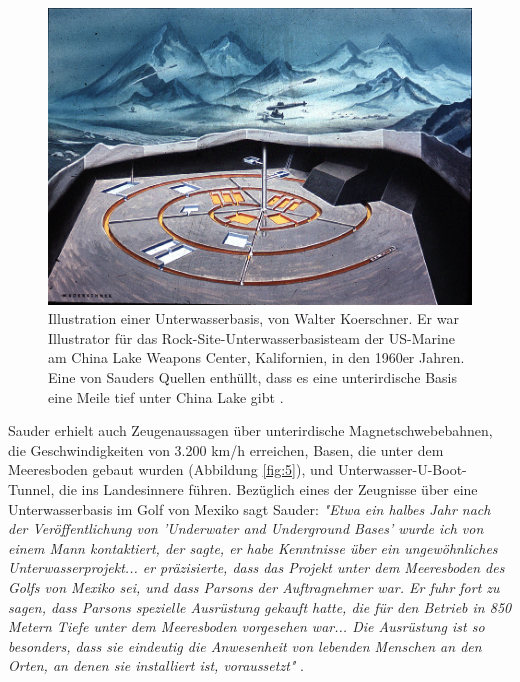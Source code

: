 \documentclass[10pt,twocolumn,letterpaper]{article}
\begin{document}
\begin{figure}[t]
\begin{center}
   \includegraphics[width=1\linewidth]{undersea.jpg}
\end{center}
   \caption{Illustration einer Unterwasserbasis, von Walter Koerschner. Er war Illustrator für das Rock-Site-Unterwasserbasisteam der US-Marine am China Lake Weapons Center, Kalifornien, in den 1960er Jahren. Eine von Sauders Quellen enthüllt, dass es eine unterirdische Basis eine Meile tief unter China Lake gibt \cite{22,23}.}
\label{fig:5}
\label{fig:onecol}
\end{figure}

Sauder erhielt auch Zeugenaussagen über unterirdische Magnetschwebebahnen, die Geschwindigkeiten von 3.200 km/h erreichen, Basen, die unter dem Meeresboden gebaut wurden (Abbildung \ref{fig:5}), und Unterwasser-U-Boot-Tunnel, die ins Landesinnere führen. Bezüglich eines der Zeugnisse über eine Unterwasserbasis im Golf von Mexiko sagt Sauder: \textit{"Etwa ein halbes Jahr nach der Veröffentlichung von 'Underwater and Underground Bases' wurde ich von einem Mann kontaktiert, der sagte, er habe Kenntnisse über ein ungewöhnliches Unterwasserprojekt... er präzisierte, dass das Projekt unter dem Meeresboden des Golfs von Mexiko sei, und dass Parsons der Auftragnehmer war. Er fuhr fort zu sagen, dass Parsons spezielle Ausrüstung gekauft hatte, die für den Betrieb in 850 Metern Tiefe unter dem Meeresboden vorgesehen war... Die Ausrüstung ist so besonders, dass sie eindeutig die Anwesenheit von lebenden Menschen an den Orten, an denen sie installiert ist, voraussetzt"} \cite{22}.
\end{document}
